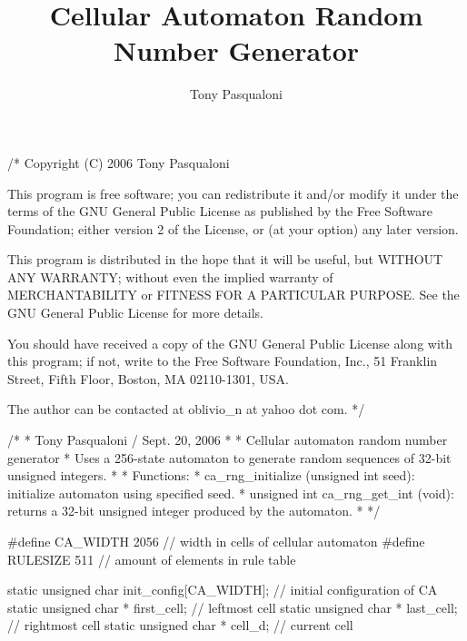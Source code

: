 \documentclass{article}
\begin{document}
  \title{Cellular Automaton Random Number Generator}
  \author{Tony Pasqualoni}
  \maketitle

\begin{ccode}
/*
Copyright (C) 2006  Tony Pasqualoni 

This program is free software; you can redistribute it and/or
modify it under the terms of the GNU General Public License
as published by the Free Software Foundation; either version 2
of the License, or (at your option) any later version.

This program is distributed in the hope that it will be useful,
but WITHOUT ANY WARRANTY; without even the implied warranty of
MERCHANTABILITY or FITNESS FOR A PARTICULAR PURPOSE.  See the
GNU General Public License for more details.

You should have received a copy of the GNU General Public License
along with this program; if not, write to the Free Software
Foundation, Inc., 51 Franklin Street, Fifth Floor, Boston, MA  02110-1301, USA.

The author can be contacted at oblivio_n at yahoo dot com.
*/

/*
 *  Tony Pasqualoni / Sept. 20, 2006
 *
 *  Cellular automaton random number generator
 *  Uses a 256-state automaton to generate random sequences of 32-bit unsigned integers.
 *
 *  Functions:
 *  ca_rng_initialize (unsigned int seed): initialize automaton using specified seed.
 *  unsigned int ca_rng_get_int (void): returns a 32-bit unsigned integer produced by the automaton.
 *
 */

#define CA_WIDTH 2056   // width in cells of cellular automaton
#define RULESIZE 511    // amount of elements in rule table

static unsigned char init_config[CA_WIDTH];  // initial configuration of CA
static unsigned char * first_cell;           // leftmost cell
static unsigned char * last_cell;            // rightmost cell
static unsigned char * cell_d;               // current cell


\end{ccode}
\end{document}
